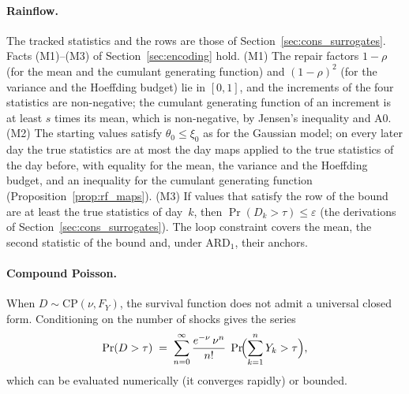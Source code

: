 \documentclass[11pt,a4paper]{article}
\theoremstyle{plain}
\theoremstyle{definition}
\theoremstyle{remark}
\begin{document}
\paragraph{Rainflow.}
The tracked statistics and the rows are those of Section~\ref{sec:cons_surrogates}.
Facts (M1)--(M3) of Section~\ref{sec:encoding} hold.
(M1) The repair factors $1-\rho$ (for the mean and the cumulant generating function) and $(1-\rho)^2$ (for the variance and the Hoeffding budget) lie in $[0, 1]$, and the increments of the four statistics are non-negative; the cumulant generating function of an increment is at least $s$ times its mean, which is non-negative, by Jensen's inequality and A0.
(M2) The starting values satisfy $\theta_0 \le \xi_0$ as for the Gaussian model; on every later day the true statistics are at most the day maps applied to the true statistics of the day before, with equality for the mean, the variance and the Hoeffding budget, and an inequality for the cumulant generating function (Proposition~\ref{prop:rf_maps}).
(M3) If values that satisfy the row of the bound are at least the true statistics of day~$k$, then $\Pr(D_k > \tau) \le \varepsilon$ (the derivations of Section~\ref{sec:cons_surrogates}).
The loop constraint covers the mean, the second statistic of the bound and, under $\text{ARD}_1$, their anchors.

\paragraph{Compound Poisson.}
When $D \sim \mathrm{CP}(\nu,F_Y)$, the survival function does not admit a universal closed form.
Conditioning on the number of shocks gives the series
\begin{equation}\label{eq:surv_cp}
  \Pr(D > \tau) \;=\; \sum_{n=0}^{\infty} \frac{e^{-\nu}\,\nu^n}{n!}\;\Pr\!\Bigl(\sum_{k=1}^{n} Y_k > \tau\Bigr),
\end{equation}
which can be evaluated numerically (it converges rapidly) or bounded.
\end{document}
